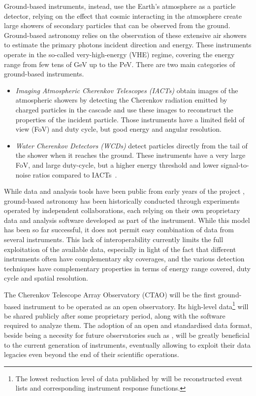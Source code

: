 \documentclass[longauth]{aa}
\begin{document}
Ground-based instruments, instead, use the Earth's atmosphere as a particle detector, relying on the effect that
cosmic \gammarays interacting in the atmosphere create large showers of secondary particles that can be observed from the ground.
Ground-based \gammaray astronomy relies on the observation of these extensive air showers to estimate the
primary \gammaray photons incident direction and energy.
These instruments operate in the so-called very-high-energy (VHE) regime,
covering the energy range from few tens of \si{GeV} up to the \si{PeV}.
There are two main categories of ground-based instruments.

\begin{itemize}
\setlength\itemsep{1em}

\item \textit{Imaging Atmospheric Cherenkov Telescopes (IACTs)} obtain images of the atmospheric showers
by detecting the Cherenkov radiation emitted by charged particles in the cascade and
use these images to reconstruct the properties of the incident particle.
Those instruments have a limited field of view (FoV) and duty cycle, but
good energy and angular resolution.
	
\item \textit{Water Cherenkov Detectors (WCDs)} detect particles directly from the tail of the
shower when it reaches the ground. These instruments have a very
large FoV, and large duty-cycle, but a higher energy threshold and
lower signal-to-noise ratios compared to IACTs~\citep{2015CRPhy..16..610D}.

\end{itemize}

While \fermi data and analysis tools have been public from early years
of the project \citep{Atwood2009}, ground-based \gammaray astronomy has been historically conducted
through experiments operated by independent collaborations, each relying
on their own proprietary data and analysis software developed as part of the
instrument. While this model has been so far successful, it does not
permit easy combination of data from several instruments. This lack of
interoperability currently limits the full exploitation of the
available \gammaray data, especially in light of the fact that different instruments often have
complementary sky coverages, and the various detection
techniques have complementary properties in terms of energy range covered,
duty cycle and spatial resolution.

The Cherenkov Telescope Array Observatory (CTAO) will be the first ground-based
\gammaray instrument to be operated as an open observatory.
Its high-level data\footnote{The lowest reduction level of data published by \cta will be reconstructed event lists and corresponding instrument response functions.}
will be shared publicly after some proprietary period, along with the software required to analyze them.
The adoption of an open and standardised \gammaray data format, beside being a necesity for future observatories such as \cta,
will be greatly beneficial to the current generation of instruments, eventually allowing to exploit their data legacies even
beyond the end of their scientific operations.
\end{document}
